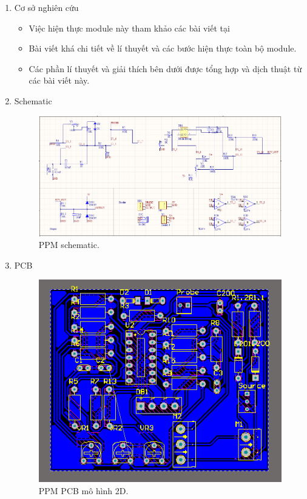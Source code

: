 \documentclass[a4paper,12pt,oneside]{article}
\begin{document}
\begin{enumerate}
\item Cơ sở nghiên cứu
	\begin{itemize}
	\item Việc hiện thực module này tham khảo các bài viết tại \cite{ppm} \cite{electrical} \cite{actodc}
	\item Bài viết khá chi tiết về lí thuyết và các bước hiện thực toàn bộ module.
	\item Các phần lí thuyết và giải thích bên dưới được tổng hợp và dịch thuật từ các bài viết này.
	\end{itemize}
	
\item Schematic

\begin{figure}[H]
\centering
\includegraphics[scale=.65]{hinh/PPM/schematic_ppm.PNG}
\caption{PPM schematic.}
\end{figure}

\item PCB

\begin{figure}[H]
\centering
\includegraphics[scale=.7]{hinh/PPM/ppm_2d.PNG}
\caption{PPM PCB mô hình 2D.}
\end{figure}


\end{enumerate}
\end{document}
